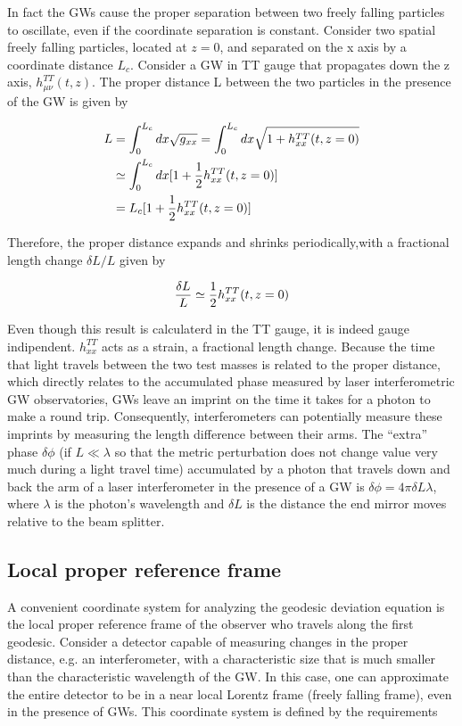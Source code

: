 \documentclass[binding=0.6cm, LaM]{sapthesis}
\begin{document}
	In fact the GWs cause the proper separation between two freely falling particles to oscillate, 
	even if the coordinate separation is constant. Consider two spatial freely falling particles, 
	located at $z = 0$, and separated on the x axis by a coordinate distance $L_c$. 
	Consider a GW in TT gauge that propagates down the z axis, $h^{TT}_{\mu\nu}(t,z)$. 
	The proper distance L between the two particles in the presence of the GW is given by

		\begin{align}
		L & = \int^{L_c}_{0}{dx\sqrt{g_{xx}}} = \int^{L_c}_{0}dx\sqrt{1 + h^{TT}_{xx}(t,z=0)} \\
		& \simeq \int^{L_c}_{0}{dx[1 + {1 \over 2}h^{TT}_{xx}(t,z=0)]} \\
		&= L_c[1 + {1 \over 2}h^{TT}_{xx}(t,z=0)]
		\end{align}

	Therefore, the proper distance expands and shrinks periodically,with a fractional length change $\delta L/L$ given by

		\begin{equation}
		{{\delta L}\over{L}} \simeq {1 \over 2} h_{xx}^{TT}(t,z=0)
		\end{equation}

	Even though this result is calculaterd in the TT gauge, it is indeed gauge indipendent.
	$h_{xx}^{TT}$ acts as a strain, a fractional length change.
	Because the time that light travels between the two test masses is related to the proper distance,  
	which directly relates to the accumulated phase measured by laser interferometric GW observatories,
	GWs leave an imprint on the time it takes for a photon to make a round trip. 
	Consequently, interferometers can potentially measure these imprints by measuring the length difference between
	their arms. The “extra” phase $\delta \phi$ (if $L \ll \lambda$ so that the metric perturbation 
	does not change value very much during a light travel time) accumulated by a photon that travels
	down and back the arm of a laser interferometer in the presence of a GW is $\delta \phi = 4\pi \delta L \lambda$, 
	where $\lambda$ is the photon’s wavelength and $\delta L$ is the distance
	the end mirror moves relative to the beam splitter.


\subsection{Local proper reference frame}

	A convenient coordinate system for analyzing the geodesic deviation equation is the 
	local proper reference frame of the observer who travels along the first geodesic.
	Consider a detector capable of measuring changes in the proper distance, e.g. an interferometer, 
	with a characteristic size that is much smaller than the characteristic wavelength of the GW.
	In this case, one can approximate the entire detector to be in a near local Lorentz frame  
	(freely falling frame), even in the presence of GWs. This coordinate system is defined by the requirements
\end{document}
